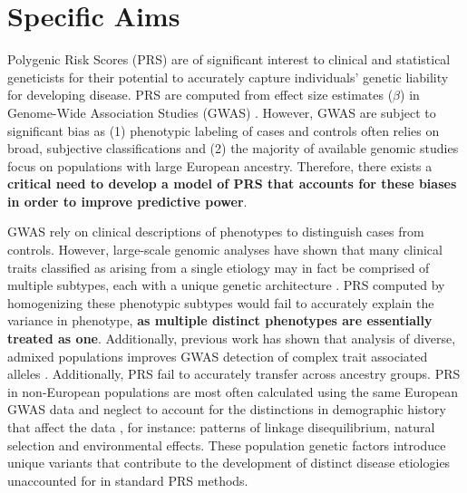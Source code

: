 \documentclass[11pt]{article}  %
\begin{document}
\pagestyle{empty}











\section*{Specific Aims}
Polygenic Risk Scores (PRS) are of significant interest to clinical and statistical geneticists for their potential to accurately capture individuals' genetic liability for developing disease. PRS are computed from effect size estimates ($\beta$) in Genome-Wide Association Studies (GWAS) \cite{choi_tutorial_2020}. However, GWAS are subject to significant bias \cite{dudbridge_power_2013} as (1) phenotypic labeling of cases and controls often relies on broad, subjective classifications and (2) the majority of available genomic studies focus on populations with large European ancestry. Therefore, there exists a \textbf{critical need to develop a model of PRS that accounts for these biases in order to improve predictive power}.

GWAS rely on clinical descriptions of phenotypes to distinguish cases from controls. However, large-scale genomic analyses have shown that many clinical traits classified as arising from a single etiology may in fact be comprised of multiple subtypes, each with a unique genetic architecture \cite{nicolau_topology_2011}. PRS computed by homogenizing these phenotypic subtypes would fail to accurately explain the variance in phenotype, \textbf{as multiple distinct phenotypes are essentially treated as one}. Additionally, previous work has shown that analysis of diverse, admixed populations improves GWAS detection of complex trait associated alleles \cite{wojcik_genetic_2019}. Additionally, PRS fail to accurately transfer across ancestry groups. PRS in non-European populations are most often calculated using the same European GWAS data and neglect to account for the distinctions in demographic history that affect the data \cite{x}, for instance: patterns of linkage disequilibrium, natural selection and environmental effects. These population genetic factors introduce unique variants that contribute to the development of distinct disease etiologies unaccounted for in standard PRS methods. 
\end{document}
